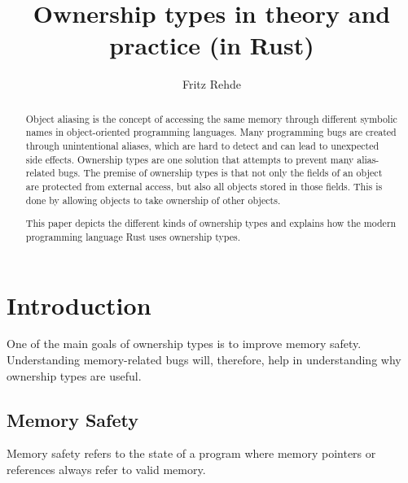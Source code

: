 \documentclass[sigplan,11pt,nonacm]{acmart}
\begin{document}
\title{Ownership types in theory and practice (in Rust)}
\author{Fritz Rehde}


\begin{abstract}

Object aliasing is the concept of accessing the same memory through different symbolic names in object-oriented programming languages.
Many programming bugs are created through unintentional aliases, which are hard to detect and can lead to unexpected side effects.
Ownership types are one solution that attempts to prevent many alias-related bugs.
The premise of ownership types is that not only the fields of an object are protected from external access, but also all objects stored in those fields.
This is done by allowing objects to take ownership of other objects.

This paper depicts the different kinds of ownership types and explains how the modern programming language Rust uses ownership types.


\end{abstract}


\maketitle


\section{Introduction}
\label{sec:introduction}

One of the main goals of ownership types is to improve memory safety.
Understanding memory-related bugs will, therefore, help in understanding why ownership types are useful.


\subsection{Memory Safety}
\label{sec:memory-safety}

Memory safety refers to the state of a program where memory pointers or references always refer to valid memory.
\end{document}
